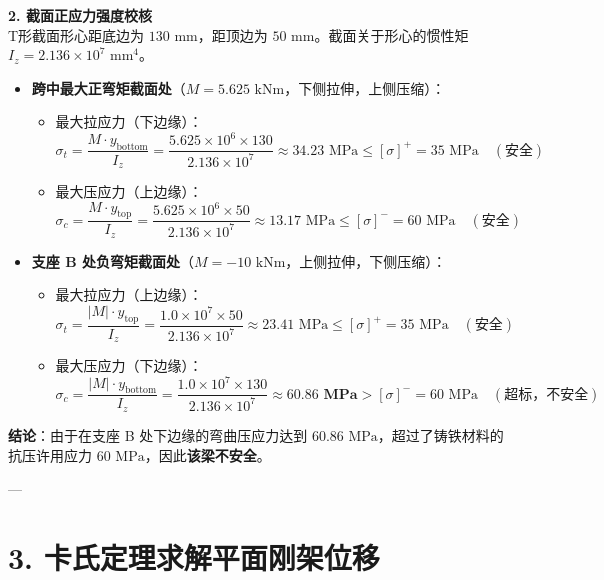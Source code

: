 \documentclass[11pt,a4paper]{ctexrep}
\begin{document}
{\textbf{2. 截面正应力强度校核} \\
T形截面形心距底边为 $130\text{ mm}$，距顶边为 $50\text{ mm}$。截面关于形心的惯性矩 $I_z = 2.136 \times 10^7\text{ mm}^4$。
\begin{itemize}
    \item \textbf{跨中最大正弯矩截面处}（$M = 5.625\text{ kNm}$，下侧拉伸，上侧压缩）：
          \begin{itemize}
              \item 最大拉应力（下边缘）：
                    \[
                        \sigma_t = \frac{M \cdot y_{\text{bottom}}}{I_z} = \frac{5.625 \times 10^6 \times 130}{2.136 \times 10^7} \approx 34.23\text{ MPa} \le [\sigma]^+ = 35\text{ MPa} \quad (\text{安全})
                    \]
              \item 最大压应力（上边缘）：
                    \[
                        \sigma_c = \frac{M \cdot y_{\text{top}}}{I_z} = \frac{5.625 \times 10^6 \times 50}{2.136 \times 10^7} \approx 13.17\text{ MPa} \le [\sigma]^- = 60\text{ MPa} \quad (\text{安全})
                    \]
          \end{itemize}
    \item \textbf{支座 B 处负弯矩截面处}（$M = -10\text{ kNm}$，上侧拉伸，下侧压缩）：
          \begin{itemize}
              \item 最大拉应力（上边缘）：
                    \[
                        \sigma_t = \frac{|M| \cdot y_{\text{top}}}{I_z} = \frac{1.0 \times 10^7 \times 50}{2.136 \times 10^7} \approx 23.41\text{ MPa} \le [\sigma]^+ = 35\text{ MPa} \quad (\text{安全})
                    \]
              \item 最大压应力（下边缘）：
                    \[
                        \sigma_c = \frac{|M| \cdot y_{\text{bottom}}}{I_z} = \frac{1.0 \times 10^7 \times 130}{2.136 \times 10^7} \approx \mathbf{60.86\text{ MPa}} > [\sigma]^- = 60\text{ MPa} \quad (\mathbf{\text{超标，不安全}})
                    \]
          \end{itemize}
\end{itemize}
\textbf{结论}：由于在支座 B 处下边缘的弯曲压应力达到 $60.86\text{ MPa}$，超过了铸铁材料的抗压许用应力 $60\text{ MPa}$，因此\textbf{该梁不安全}。

---

\section*{3. 卡氏定理求解平面刚架位移}

}
\end{document}
